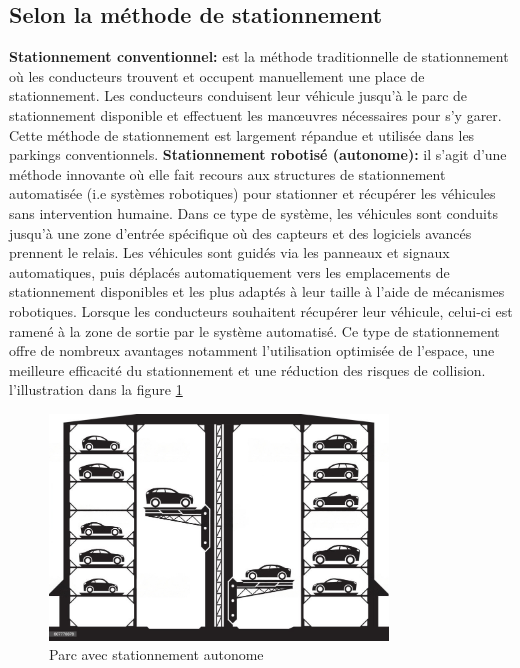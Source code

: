 \subsection{Selon la méthode de stationnement}
\begin{outline}
    \1  \textbf{Stationnement conventionnel: } est la méthode traditionnelle de stationnement où les conducteurs trouvent et occupent manuellement une place de stationnement. Les conducteurs conduisent leur véhicule jusqu'à le parc de stationnement disponible et effectuent les manœuvres nécessaires pour s'y garer. Cette méthode de stationnement est largement répandue et utilisée dans les parkings conventionnels.
    \1  \textbf{Stationnement robotisé (autonome): } il s'agit d'une méthode innovante où elle fait recours aux structures de stationnement automatisée (i.e systèmes robotiques) pour stationner et récupérer les véhicules sans intervention humaine. Dans ce type de système, les véhicules sont conduits jusqu'à une zone d'entrée spécifique où des capteurs et des logiciels avancés prennent le relais. Les véhicules sont guidés via les panneaux et signaux automatiques, puis déplacés automatiquement vers les emplacements de stationnement disponibles et les plus adaptés à leur taille à l'aide de mécanismes robotiques. Lorsque les conducteurs souhaitent récupérer leur véhicule, celui-ci est ramené à la zone de sortie par le système automatisé. Ce type de stationnement offre de nombreux avantages notamment l'utilisation optimisée de l'espace, une meilleure efficacité du stationnement et une réduction des risques de collision. l'illustration dans la figure  \ref{Automaticcarpark} 
    
\begin{figure}[H]
	\centering
	\includegraphics[height=06cm]{img/ch1-Automatic car parking -01.jpeg}
	\caption{Parc avec stationnement autonome}
 \label{Automaticcarpark}
\end{figure}



\end{outline}

